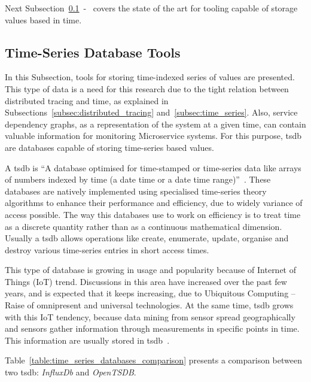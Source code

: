 Next Subsection~\ref{subsec:time_series_database_tools}~-~ covers the state of the art for tooling capable of storage values based in time.

\subsection{Time-Series Database Tools}
\label{subsec:time_series_database_tools}

In this Subsection, tools for storing time-indexed series of values are presented. This type of data is a need for this research due to the tight relation between distributed tracing and time, as explained in Subsections~\ref{subsec:distributed_tracing} and~\ref{subsec:time_series}. Also, service dependency graphs, as a representation of the system at a given time, can contain valuable information for monitoring Microservice systems. For this purpose, \gls{tsdb} are databases capable of storing time-series based values.

A \gls{tsdb} is ``A database optimised for time-stamped or time-series data like arrays of numbers indexed by time (a date time or a date time range)''~\cite{Dunning2015}. These databases are natively implemented using specialised time-series theory algorithms to enhance their performance and efficiency, due to widely variance of access possible. The way this databases use to work on efficiency is to treat time as a discrete quantity rather than as a continuous mathematical dimension. Usually a \gls{tsdb} allows operations like create, enumerate, update, organise and destroy various time-series entries in short access times.

This type of database is growing in usage and popularity because of Internet of Things (IoT) trend. Discussions in this area have increased over the past few years, and is expected that it keeps increasing, due to Ubiquitous Computing -- Raise of omnipresent and universal technologies. At the same time, \gls{tsdb} grows with this IoT tendency, because data mining from sensor spread geographically and sensors gather information through measurements in specific points in time. This information are usually stored in \gls{tsdb}~\cite{TanayPant2019}.

\newpage

Table~\ref{table:time_series_databases_comparison} presents a comparison between two \gls{tsdb}: \textit{InfluxDb} and \textit{OpenTSDB}.

